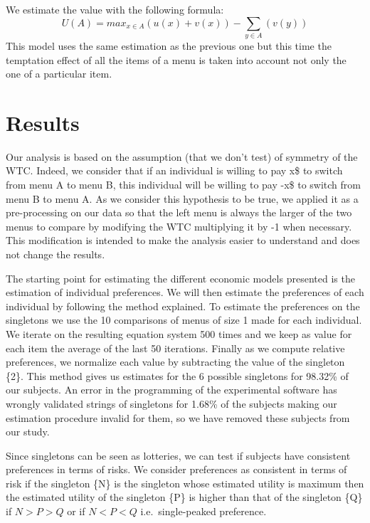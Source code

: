 \documentclass[
]{book}
\begin{document}
We estimate the value with the following formula:
\[ U(A) = max_{x \in A}(u(x) + v(x)) - \sum_{y \in A}(v(y)) \]
This model uses the same estimation as the previous one but this time the
temptation effect of all the items of a menu is taken into account not only the
one of a particular item.

\hypertarget{result3}{%
\section{Results}\label{result3}}

Our analysis is based on the assumption (that we don't test) of symmetry of the
WTC.
Indeed, we consider that if an individual is willing to pay x\$ to switch from
menu A to menu B, this individual will be willing to pay -x\$ to switch from
menu B to menu A.
As we consider this hypothesis to be true, we applied it as a pre-processing on
our data so that the left menu is always the larger of the two menus to compare
by modifying the WTC multiplying it by -1 when necessary.
This modification is intended to make the analysis easier to understand and does
not change the results.

The starting point for estimating the different economic models presented is the
estimation of individual preferences.
We will then estimate the preferences of each individual by following the method
explained.
To estimate the preferences on the singletons we use the 10 comparisons of menus
of size 1 made for each individual.
We iterate on the resulting equation system 500 times and we keep as value for
each item the average of the last 50 iterations.
Finally as we compute relative preferences, we normalize each value by
subtracting the value of the singleton \{2\}.
This method gives us estimates for the 6 possible singletons for
98.32\% of our subjects.
An error in the programming of the experimental software has wrongly validated
strings of singletons for 1.68\% of the subjects making our
estimation procedure invalid for them, so we have removed these subjects from
our study.

Since singletons can be seen as lotteries, we can test if subjects have
consistent preferences in terms of risks.
We consider preferences as consistent in terms of risk if the singleton \{N\} is
the singleton whose estimated utility is maximum then the estimated utility of
the singleton \{P\} is higher than that of the singleton \{Q\} if \(N > P > Q\) or if
\(N < P < Q\) i.e.~single-peaked preference.
\end{document}

